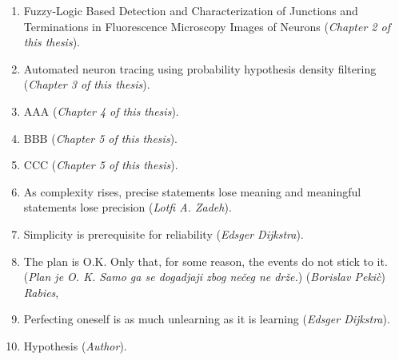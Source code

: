 \documentclass[10pt, twoside]{report}
\begin{document}
\begin{enumerate}
  
\item Fuzzy-Logic Based Detection and Characterization of Junctions and Terminations in Fluorescence Microscopy Images of Neurons (\emph{Chapter 2 of this thesis}). 
  
\medskip
  
\item Automated neuron tracing using probability hypothesis density filtering
	(\emph{Chapter 3 of this thesis}).  
  
\medskip
\item AAA 
	(\emph{Chapter 4 of this thesis}). 

\medskip
\item BBB 
	(\emph{Chapter 5 of this thesis}). 

\medskip

\item CCC 
	(\emph{Chapter 5 of this thesis}). 

\medskip 

\item As complexity rises, precise statements lose meaning and meaningful statements lose precision 
	(\emph{Lotfi A. Zadeh}). 

\medskip
  
\item Simplicity is prerequisite for reliability 
	(\emph{Edsger Dijkstra}). 

\medskip

\item The plan is O.K. Only that, for some reason, the events do not stick to it. (\emph{Plan je O. K. Samo ga se dogadjaji zbog ne\v{c}eg ne dr\v{z}e.})
(\emph{Borislav Peki\`{c}}) \emph{Rabies}, 

\medskip

\item Perfecting oneself is as much unlearning as it is learning (\emph{Edsger Dijkstra}).

\medskip

\item Hypothesis (\emph{Author}).
\medskip

\end{enumerate}

\end{document}
